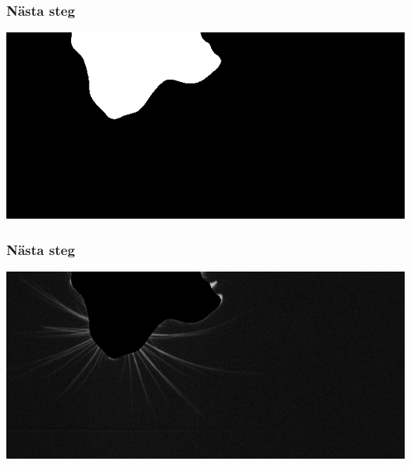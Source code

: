 \documentclass[]{beamer}
\renewcommand{\ae}{\"{a}}
\begin{document}
\begin{frame}
  \frametitle{N\ae sta steg}
  \includegraphics[width=1\textwidth]{preprocessing/frame-0759_snout.png}
\end{frame}


\begin{frame}
  \frametitle{N\ae sta steg}
  \includegraphics[width=1\textwidth]{preprocessing/frame-0759_whiskers.png}
\end{frame}
\end{document}
